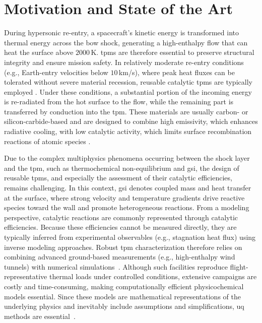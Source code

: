 \section{Motivation and State of the Art}
\label{sc:cfd:motivation}

During hypersonic re-entry, a spacecraft’s kinetic energy is transformed into thermal energy across the bow shock, generating a high-enthalpy flow that can heat the surface above $2000$\,K. \glspl{tpm} are therefore essential to preserve structural integrity and ensure mission safety. In relatively moderate re-entry conditions (e.g., Earth-entry velocities below $10$\,km/s), where peak heat fluxes can be tolerated without severe material recession, reusable catalytic \glspl{tpm} are typically employed \cite{vignoles2018ablative}. Under these conditions, a substantial portion of the incoming energy is re-radiated from the hot surface to the flow, while the remaining part is transferred by conduction into the \gls{tpm}. These materials are usually carbon- or silicon-carbide-based and are designed to combine high emissivity, which enhances radiative cooling, with low catalytic activity, which limits surface recombination reactions of atomic species \cite{laub2004thermal}.

\smallskip
Due to the complex multiphysics phenomena occurring between the shock layer and the \gls{tpm}, such as thermochemical non-equilibrium and \gls{gsi}, the design of reusable \glspl{tpm}, and especially the assessment of their catalytic efficiencies, remains challenging. In this context, \gls{gsi} denotes coupled mass and heat transfer at the surface, where strong velocity and temperature gradients drive reactive species toward the wall and promote heterogeneous reactions. From a modeling perspective, catalytic reactions are commonly represented through catalytic efficiencies. Because these efficiencies cannot be measured directly, they are typically inferred from experimental observables (e.g., stagnation heat flux) using inverse modeling approaches. Robust \gls{tpm} characterization therefore relies on combining advanced ground-based measurements (e.g., high-enthalpy wind tunnels) with numerical simulations~\cite{PhDThesis_Bellas}. Although such facilities reproduce flight-representative thermal loads under controlled conditions, extensive campaigns are costly and time-consuming, making computationally efficient physicochemical models essential. Since these models are mathematical representations of the underlying physics and inevitably include assumptions and simplifications, \gls{uq} methods are essential~\cite{PhDThesis_Capriati}.

